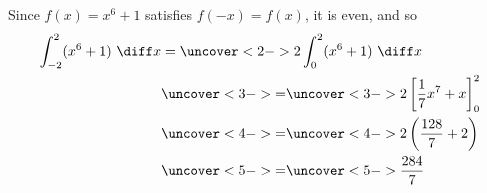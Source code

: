 \begin{frame}
\begin{example}[Example 9, p. 381]
Since $f(x) = x^6 + 1$ satisfies $f(-x) = f(x)$, it is even, and so
\abovedisplayskip=0pt
\belowdisplayskip=0pt
\abovedisplayshortskip=0pt
\belowdisplayshortskip=0pt
\begin{align*}
\int_{-2}^2 (x^6+1) \ \diff x %
& = %
\uncover<2->{%
2\int_0^2 (x^6+1) \ \diff x%
}\\%
& \uncover<3->{ = } %
\uncover<3->{%
2\left[ \frac{1}{7}x^7 + x\right]_0^2%
}\\%
& \uncover<4->{ = } %
\uncover<4->{%
2\left( \frac{128}{7} + 2\right)%
}\\%
& \uncover<5->{ = } %
\uncover<5->{%
\frac{284}{7}%
}%
\end{align*}
\end{example}
\end{frame}
